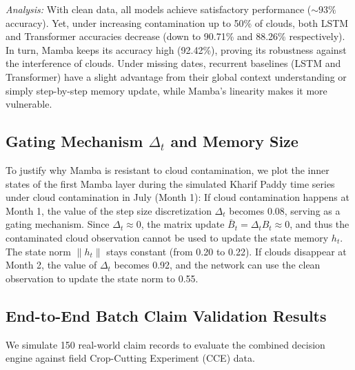 \documentclass[conference]{IEEEtran}
\begin{document}
\textit{Analysis:} With clean data, all models achieve satisfactory performance ($\sim 93\%$ accuracy). Yet, under increasing contamination up to 50\% of clouds, both LSTM and Transformer accuracies decrease (down to 90.71\% and 88.26\% respectively). In turn, Mamba keeps its accuracy high (92.42\%), proving its robustness against the interference of clouds. Under missing dates, recurrent baselines (LSTM and Transformer) have a slight advantage from their global context understanding or simply step-by-step memory update, while Mamba's linearity makes it more vulnerable.

\subsection{Gating Mechanism $\Delta_t$ and Memory Size}
To justify why Mamba is resistant to cloud contamination, we plot the inner states of the first Mamba layer during the simulated Kharif Paddy time series under cloud contamination in July (Month 1): If cloud contamination happens at Month 1, the value of the step size discretization $\Delta_t$ becomes 0.08, serving as a gating mechanism. Since $\Delta_t \approx 0$, the matrix update $\bar{B}_t = \Delta_t B_t \approx 0$, and thus the contaminated cloud observation cannot be used to update the state memory $h_t$. The state norm $\|h_t\|$ stays constant (from 0.20 to 0.22). If clouds disappear at Month 2, the value of $\Delta_t$ becomes 0.92, and the network can use the clean observation to update the state norm to 0.55.

\subsection{End-to-End Batch Claim Validation Results}
We simulate 150 real-world claim records to evaluate the combined decision engine against field Crop-Cutting Experiment (CCE) data.

\begin{table}[htbp]
\caption{Batch Claims Validation Metrics}
\label{tab:claims_metrics}
\centering
{}
\end{table}
\end{document}
